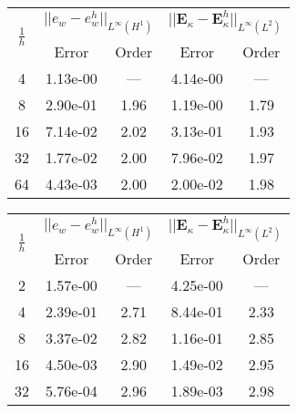 \begin{table}[hp]
	\centering
	\begin{tabular}{ccccc}
		\hline 
		\multirow{2}{*}{$\frac{1}{h}$} & \multicolumn{2}{c}{$||e_w - e_w^h||_{L^{\infty}(H^1)}$}  & \multicolumn{2}{c}{$||\bm{E}_\kappa - \bm{E}_\kappa^h||_{L^{\infty}(L^2)}$}   \\ 
		& Error & Order  & Error & Order  \\
		\hline 
		4  & 1.13e-00 & ---  & 4.14e-00 & ---  \\ 
		8  & 2.90e-01 & 1.96 & 1.19e-00 & 1.79 \\ 
		16 & 7.14e-02 & 2.02 & 3.13e-01 & 1.93 \\ 
		32 & 1.77e-02 & 2.00 & 7.96e-02 & 1.97 \\ 
		64 & 4.43e-03 & 2.00 & 2.00e-02 & 1.98 \\ 
		\hline 
	\end{tabular} 
	\captionsetup{width=0.95\linewidth}
	\vspace{1mm}
	\label{tab:reskirHHJ_CSFS_k2}
\end{table}

\begin{table}[hp]
	\centering
	\begin{tabular}{ccccc}
		\hline 
		\multirow{2}{*}{$\frac{1}{h}$} & \multicolumn{2}{c}{$||e_w - e_w^h||_{L^{\infty}(H^1)}$}  & \multicolumn{2}{c}{$||\bm{E}_\kappa - \bm{E}_\kappa^h||_{L^{\infty}(L^2)}$}   \\ 
		& Error & Order  & Error & Order  \\
		\hline 
		2  & 1.57e-00 & ---  & 4.25e-00 & ---  \\ 
		4  & 2.39e-01 & 2.71 & 8.44e-01 & 2.33 \\ 
		8  & 3.37e-02 & 2.82 & 1.16e-01 & 2.85 \\ 
		16 & 4.50e-03 & 2.90 & 1.49e-02 & 2.95 \\ 
		32 & 5.76e-04 & 2.96 & 1.89e-03 & 2.98 \\ 
		\hline 
	\end{tabular} 
	\captionsetup{width=0.95\linewidth}
	\vspace{1mm}
	\label{tab:reskirHHJ_CSFS_k3}
\end{table}

